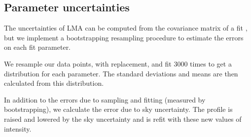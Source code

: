 \subsection{Parameter uncertainties}
The uncertainties of LMA can be computed from the covariance matrix of a fit \citep{hughes_measurements_2010}, but we implement a bootstrapping resampling procedure to estimate the errors on each fit parameter. 

We resample our data points, with replacement, and fit 3000 times to get a distribution for each parameter. The standard deviations and means are then calculated from this distribution.

In addition to the errors due to sampling and fitting (measured by bootstrapping), we calculate the error due to sky uncertainty. The profile is raised and lowered by the sky uncertainty and is refit with these new values of intensity. 